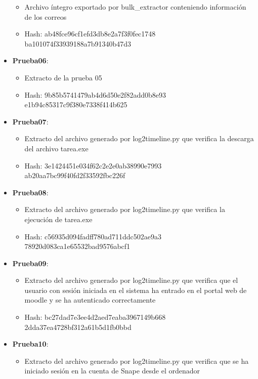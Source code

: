 \begin{itemize}
{\begin{itemize}
      \item{Archivo íntegro exportado por bulk\_extractor conteniendo información de los correos}
      \item{Hash}: ab48fce96cf1efd3db8e2a7f3f0fec1748\\ba101074f33939188a7b91340b47d3
    \end{itemize}}
  \item{\textbf{Prueba06}: 
    \begin{itemize}
      \item{Extracto de la prueba 05}
      \item{Hash}: 9b85b5741479ab4d6d50e2f82add0b8e93\\e1b94c85317c9f380e7338f414b625
    \end{itemize}}
  \item{\textbf{Prueba07}: 
    \begin{itemize}
      \item{Extracto del archivo generado por log2timeline.py que verifica la descarga del archivo tarea.exe}
      \item{Hash}: 3e1424451e034f62c2e2e0ab38990e7993\\ab20aa7bc99f40fd2f33592fbc226f
    \end{itemize}}
  \item{\textbf{Prueba08}: 
    \begin{itemize}
      \item{Extracto del archivo generado por log2timeline.py que verifica la ejecución de tarea.exe}
      \item{Hash}: c56935d094fadff780ad711ddc502ae9a3\\78920d083ca1e65532bad9576abcf1
    \end{itemize}}
  \item{\textbf{Prueba09}: 
    \begin{itemize}
      \item{Extracto del archivo generado por log2timeline.py que verifica que el usuario con sesión iniciada en el sistema ha entrado en el portal web de moodle y se ha autenticado correctamente}
      \item{Hash}: bc27dad7e3ee4d2aed7eaba3967149b668\\2dda37ea4728bf312a61b5d1fb0bbd
    \end{itemize}}
  \item{\textbf{Prueba10}: 
    \begin{itemize}
      \item{Extracto del archivo generado por log2timeline.py que verifica que se ha iniciado sesión en la cuenta de Snape desde el ordenador}

\end{itemize}}
\end{itemize}
